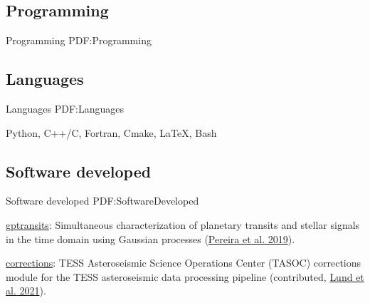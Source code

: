 \documentclass[letterpaper,10pt,oneside]{article}
\begin{document}
\begin{body}









\section
{Programming}
{Programming}
{PDF:Programming}

\subsection
{Languages}
{Languages}
{PDF:Languages}

Python, C++/C, Fortran, Cmake, \LaTeX, Bash

\BigGap
\subsection
{Software developed}
{Software developed}
{PDF:SoftwareDeveloped}

\BulletItem
\href{https://github.com/Fill4/gptransits}{gptransits}: 
Simultaneous characterization of planetary transits and stellar signals in the time domain using Gaussian processes 
(\href{https://doi.org/10.1093/mnras/stz2405}{Pereira et al. 2019}).

\GapNoBreak
\BulletItem
\href{https://github.com/tasoc/corrections}{corrections}: 
TESS Asteroseismic Science Operations Center (TASOC) corrections module for the TESS asteroseismic data processing pipeline 
(contributed, \href{https://doi.org/10.3847/1538-4365/ac214a}{Lund et al. 2021}).


\end{body}
\end{document}
